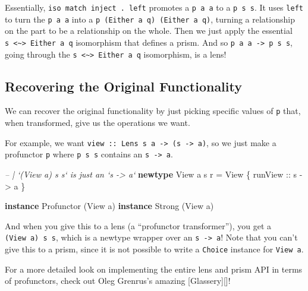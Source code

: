 \documentclass[]{article}
\newenvironment{Shaded}{}{}
\newcommand{\CommentTok}[1]{\textcolor[rgb]{0.38,0.63,0.69}{\textit{#1}}}
\newcommand{\DataTypeTok}[1]{\textcolor[rgb]{0.56,0.13,0.00}{#1}}
\newcommand{\FunctionTok}[1]{\textcolor[rgb]{0.02,0.16,0.49}{#1}}
\newcommand{\KeywordTok}[1]{\textcolor[rgb]{0.00,0.44,0.13}{\textbf{#1}}}
\newcommand{\NormalTok}[1]{#1}
\newcommand{\OtherTok}[1]{\textcolor[rgb]{0.00,0.44,0.13}{#1}}
\begin{document}
Essentially, \texttt{iso\ match\ inject\ .\ left\textquotesingle{}} promotes a
\texttt{p\ a\ a} to a \texttt{p\ s\ s}. It uses \texttt{left\textquotesingle{}}
to turn the \texttt{p\ a\ a} into a \texttt{p\ (Either\ a\ q)\ (Either\ a\ q)},
turning a relationship on the part to be a relationship on the whole. Then we
just apply the essential
\texttt{s\ \textless{}\textasciitilde{}\textgreater{}\ Either\ a\ q} isomorphism
that defines a prism. And so \texttt{p\ a\ a\ -\textgreater{}\ p\ s\ s}, going
through the \texttt{s\ \textless{}\textasciitilde{}\textgreater{}\ Either\ a\ q}
isomorphism, is a lens!

\hypertarget{recovering-the-original-functionality}{%
\subsection{Recovering the Original
Functionality}\label{recovering-the-original-functionality}}

We can recover the original functionality by just picking specific values of
\texttt{p} that, when transformed, give us the operations we want.

For example, we want
\texttt{view\ ::\ Lens\textquotesingle{}\ s\ a\ -\textgreater{}\ (s\ -\textgreater{}\ a)},
so we just make a profunctor \texttt{p} where \texttt{p\ s\ s} contains an
\texttt{s\ -\textgreater{}\ a}.

\begin{Shaded}
\begin{Highlighting}[]
\CommentTok{-- | `(View a) s s` is just an `s -> a`}
\KeywordTok{newtype} \DataTypeTok{View}\NormalTok{ a s r }\FunctionTok{=} \DataTypeTok{View}\NormalTok{ \{}\OtherTok{ runView ::}\NormalTok{ s }\OtherTok{->}\NormalTok{ a \}}

\KeywordTok{instance} \DataTypeTok{Profunctor}\NormalTok{ (}\DataTypeTok{View}\NormalTok{ a)}
\KeywordTok{instance} \DataTypeTok{Strong}\NormalTok{ (}\DataTypeTok{View}\NormalTok{ a)}
\end{Highlighting}
\end{Shaded}

And when you give this to a lens (a ``profunctor transformer''), you get a
\texttt{(View\ a)\ s\ s}, which is a newtype wrapper over an
\texttt{s\ -\textgreater{}\ a}! Note that you can't give this to a prism, since
it is not possible to write a \texttt{Choice} instance for \texttt{View\ a}.

For a more detailed look on implementing the entire lens and prism API in terms
of profunctors, check out Oleg Grenrus's amazing {[}Glassery{]}{[}{]}!
\end{document}
